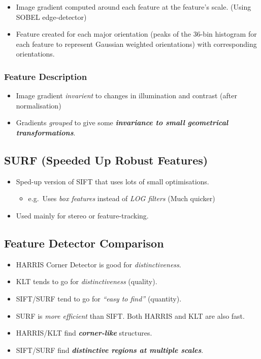 \documentclass[english, 10pt]{article}
\begin{document}
\begin{itemize}
\item
  Image gradient computed around each feature at the feature's scale.
  (Using SOBEL edge-detector)
\item
  Feature created for each major orientation (peaks of the 36-bin
  histogram for each feature to represent Gaussian weighted
  orientations) with corresponding orientations.
\end{itemize}

\subsubsection{Feature Description}\label{feature-description}

\begin{itemize}
\itemsep1pt\parskip0pt
\item
  Image gradient \emph{invarient} to changes in illumination and
  contrast (after normalisation)
\item
  Gradients \emph{grouped} to give some \textbf{\emph{invariance to
  small geometrical transformations}}.
\end{itemize}

\subsection{SURF (Speeded Up Robust
Features)}\label{surf-speeded-up-robust-features}

\begin{itemize}
\itemsep1pt\parskip0pt
\item
  Sped-up version of SIFT that uses lots of small optimisations.

  \begin{itemize}
  \itemsep1pt\parskip0pt
  \item
    e.g.~Uses \emph{box features} instead of \emph{LOG filters} (Much
    quicker)
  \end{itemize}
\item
  Used mainly for stereo or feature-tracking.
\end{itemize}

\subsection{Feature Detector
Comparison}\label{feature-detector-comparison}

\begin{itemize}
\itemsep1pt\parskip0pt
\item
  HARRIS Corner Detector is good for \emph{distinctiveness}.
\item
  KLT tends to go for \emph{distinctiveness} (quality).
\item
  SIFT/SURF tend to go for \emph{``easy to find''} (quantity).
\item
  SURF is \emph{more efficient} than SIFT. Both HARRIS and KLT are also
  fast.
\item
  HARRIS/KLT find \textbf{\emph{corner-like}} structures.
\item
  SIFT/SURF find \textbf{\emph{distinctive regions at multiple scales}}.
\end{itemize}
\end{document}
